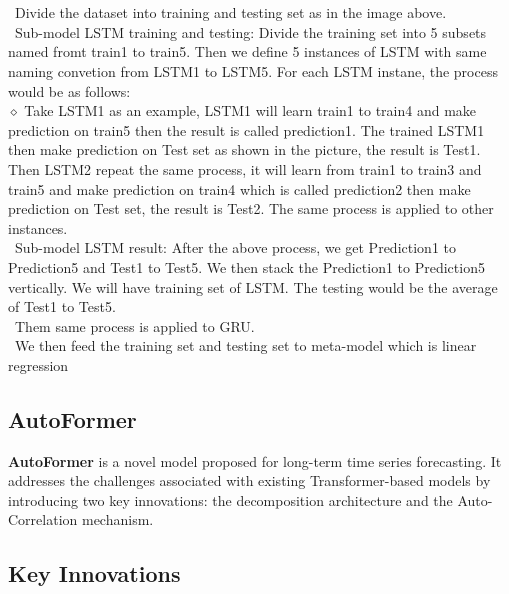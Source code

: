 \documentclass{ieeeojies}
\begin{document}
\\ \\

\indent \textbullet\ Divide the dataset into training and testing set as in the image above. \\
\indent\textbullet\ Sub-model LSTM training and testing: Divide the training set into 5 subsets named fromt train1 to train5. Then we define 5 instances of LSTM with same naming convetion from LSTM1 to LSTM5. For each LSTM instane, the process would be as follows:\\
\indent $\diamond$ Take LSTM1 as an example, LSTM1 will learn train1 to train4 and make prediction on train5 then the result is called prediction1. The trained LSTM1 then make prediction on Test set as shown in the picture, the result is Test1. Then LSTM2 repeat the same process, it will learn from train1 to train3 and train5 and make prediction on train4 which is called prediction2 then make prediction on Test set, the result is Test2. The same process is applied to other instances.\\
\parindent \textbullet\ Sub-model LSTM result: After the above process, we get Prediction1 to Prediction5 and Test1 to Test5. We then stack the Prediction1 to Prediction5 vertically. We will have training set of LSTM. The testing would be the average of Test1 to Test5.\\
\indent \textbullet\ Them same process is applied to GRU.\\
\indent \textbullet\ We then feed the training set and testing set to meta-model which is linear regression
\subsection{AutoFormer}
\textbf{AutoFormer} is a novel model proposed for long-term time series forecasting. It addresses the challenges associated with existing Transformer-based models by introducing two key innovations: the decomposition architecture and the Auto-Correlation mechanism.

\subsection*{Key Innovations}
\end{document}
